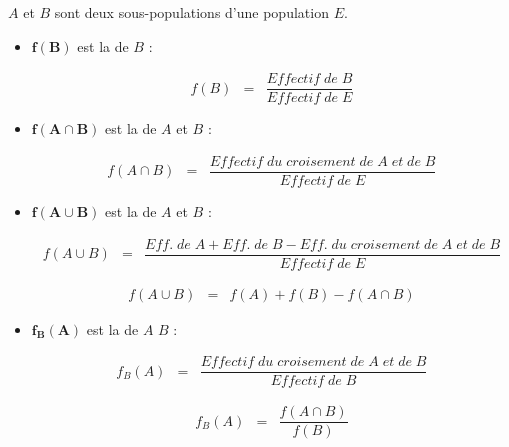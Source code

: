\documentclass[12pt,a4paper]{article}
\begin{document}
\begin{mybilan}
	$A$ et $B$ sont deux sous-populations d'une population $E$.
	\begin{itemize}
		\item $\mathbf{f(B)}$ est la  de $B$ :
		
		\begin{eqnarray*}
			f(B) &=& \dfrac{Effectif\; de\; B }{Effectif\; de\; E}
		\end{eqnarray*}
	
		\item $\mathbf{f(A \cap B)}$ est la  de $A$ et $B$ :
		
		\begin{eqnarray*}
			f(A \cap B) &=& \dfrac{Effectif\; du\; croisement \; de\;A\; et\; de\; B }{Effectif\; de\; E}
		\end{eqnarray*}
	
		\item $\mathbf{f(A \cup B)}$ est la  de $A$ et $B$ :
		
		\begin{eqnarray*}
			f(A \cup B) &=& \dfrac{Eff.\; de\; A + Eff.\; de\; B  - Eff.\; du\; croisement \; de\;A\; et\; de\; B}{Effectif\; de\; E}
		\end{eqnarray*}
	
		\begin{eqnarray*}
			f(A \cup B) &=& f(A) + f(B) - f(A \cap B)
		\end{eqnarray*}
	
		\item $\mathbf{f_B(A)}$ est la  de $A$  $B$ :
		
		\begin{eqnarray*}
			f_B(A) &=& \dfrac{Effectif\; du\; croisement \; de\;A\; et\; de\; B }{Effectif\; de\; B}
		\end{eqnarray*}
	
		\begin{eqnarray*}
			f_B(A) &=& \dfrac{f(A \cap B)}{f(B)}
		\end{eqnarray*}
	
	
	\end{itemize}
\end{mybilan}
\end{document}
